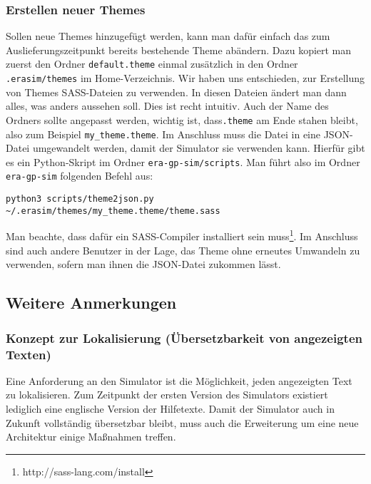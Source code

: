\subsubsection{Erstellen neuer Themes}

Sollen neue Themes hinzugefügt werden, kann man dafür einfach das zum Auslieferungszeitpunkt
bereits bestehende Theme abändern. Dazu kopiert man zuerst den Ordner \texttt{default.theme}
einmal zusätzlich in den Ordner \texttt{.erasim/themes} im Home-Verzeichnis. Wir haben uns entschieden, zur Erstellung von Themes SASS-Dateien zu verwenden. In diesen Dateien ändert man dann
alles, was anders aussehen soll. Dies ist recht intuitiv. Auch der Name des Ordners sollte angepasst werden, wichtig ist, dass\texttt{.theme} am Ende stahen bleibt, also zum Beispiel \texttt{my\_theme.theme}. Im Anschluss muss die Datei in eine JSON-Datei umgewandelt werden, damit der Simulator sie verwenden kann. Hierfür gibt es ein Python-Skript im Ordner \texttt{era-gp-sim/scripts}.
Man führt also im Ordner \texttt{era-gp-sim} folgenden Befehl aus:
\begin{lstlisting}
python3 scripts/theme2json.py ~/.erasim/themes/my_theme.theme/theme.sass
\end{lstlisting}
Man beachte, dass dafür ein SASS-Compiler installiert sein muss\footnote{http://sass-lang.com/install}. 
Im Anschluss sind auch andere Benutzer in der Lage, das Theme ohne erneutes Umwandeln zu verwenden, sofern man ihnen die JSON-Datei zukommen lässt.

 \subsection{Weitere Anmerkungen}

 \subsubsection{Konzept zur Lokalisierung (Übersetzbarkeit von angezeigten Texten)}

 Eine Anforderung an den Simulator ist die Möglichkeit, jeden angezeigten Text
 zu lokalisieren. Zum Zeitpunkt der ersten Version des Simulators existiert
 lediglich eine englische Version der Hilfetexte. Damit der Simulator auch in
 Zukunft vollständig übersetzbar bleibt, muss auch die Erweiterung um eine neue
 Architektur einige Maßnahmen treffen.\\

